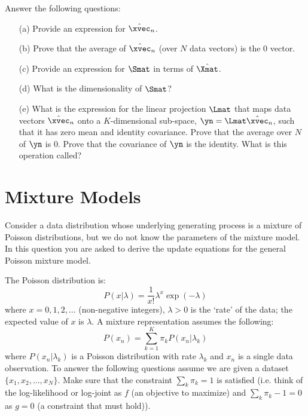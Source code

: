 \documentclass[12pt,a4paper]{article}
\newcommand{\cxn}{\hat{\xvec}_{n}}
\begin{document}
\noindent Answer the following questions:
\begin{enumerate}
	\item[(a)] Provide an expression for $\cxn$. 
	\item[(b)] Prove that the average of $\cxn$ (over $N$ data vectors) is the $0$ vector.
	\item[(c)] Provide an expression for $\Smat$ in terms of $\hat{\Xmat}$. 
	\item[(d)] What is the dimensionality of $\Smat$? 
	\item[(e)] What is the expression for the linear projection $\Lmat$ that maps data vectors $\cxn$ onto a $K$-dimensional sub-space, $\yn = \Lmat \cxn$, such that it has zero mean and identity covariance.  Prove that the average over $N$ of $\yn$ is $0$.  Prove that the covariance of $\yn$ is the identity.  What is this operation called? 
	
\end{enumerate}

\section{Mixture Models}

Consider a data distribution whose underlying generating process is a mixture of Poisson distributions, but we do not know the parameters of the mixture model. In this question you are asked to derive the update equations for the general Poisson mixture model.

The Poisson distribution is:
\begin{equation}
	P( x | \lambda ) = \frac{1}{x!} \lambda^{x} \exp(-\lambda) \nonumber
\end{equation}
where $x = 0, 1, 2, ...$ (non-negative integers), $\lambda > 0$ is the `rate' of the data; the expected value of $x$ is $\lambda$.  A mixture representation assumes the following:
\begin{equation}
	P( x_n ) = \sum_{k=1}^K \pi_k P( x_n | \lambda_k ) \nonumber
\end{equation}
where $P( x_n | \lambda_k )$ is a Poisson distribution with rate $\lambda_k$ and $x_n$ is a single data observation.  To answer the following questions assume we are given a dataset $\{x_1, x_2, \ldots, x_N\}$.  Make sure that the constraint $\sum_k \pi_k = 1$ is satisfied (i.e. think of the log-likelihood or log-joint as $f$ (an objective to maximize) and $\sum_k \pi_k - 1 = 0$ as $g=0$ (a constraint that must hold)). 
\end{document}
